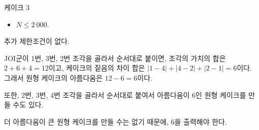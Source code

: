 \begin{problem}{케이크 3}
	\begin{itemize}
		\item $N \le 2\ 000$.
	\end{itemize}


	추가 제한조건이 없다.
	
	\Examples
	
	\begin{example}
	\end{example}
	
	JOI군이 1번, 3번, 2번 조각을 골라서 순서대로 붙이면, 조각의 가치의 합은 $2+6+4=12$이고, 케이크의 짙음의 차이 합은 $|1-4|+|4-2|+|2-1|=6$이다. 그래서 원형 케이크의 아름다움은 $12-6=6$이다.
	
	또한, 2번, 3번, 4번 조각을 골라서 순서대로 붙여서 아름다움이 6인 원형 케이크를 만들 수도 있다.
	
	더 아름다움이 큰 원형 케이크를 만들 수는 없기 때문에, 6을 출력해야 한다.
	\begin{example}
	\end{example}
	
	
\end{problem}

